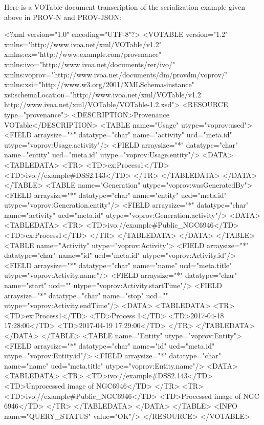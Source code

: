 Here is a VOTable document transcription of the serialization example given above in PROV-N and PROV-JSON:

\begin{verbnobox}[\scriptsize]
<?xml version="1.0" encoding="UTF-8"?>
<VOTABLE version="1.2" xmlns="http://www.ivoa.net/xml/VOTable/v1.2" xmlns:ex="http://www.example.com/provenance" xmlns:ivo="http://www.ivoa.net/documents/rer/ivo/" xmlns:voprov="http://www.ivoa.net/documents/dm/provdm/voprov/" xmlns:xsi="http://www.w3.org/2001/XMLSchema-instance" xsi:schemaLocation="http://www.ivoa.net/xml/VOTable/v1.2 http://www.ivoa.net/xml/VOTable/VOTable-1.2.xsd">
  <RESOURCE type="provenance">
    <DESCRIPTION>Provenance VOTable</DESCRIPTION>
    <TABLE name="Usage" utype="voprov:used">
      <FIELD arraysize="*" datatype="char" name="activity" ucd="meta.id" utype="voprov:Usage.activity"/>
      <FIELD arraysize="*" datatype="char" name="entity" ucd="meta.id" utype="voprov:Usage.entity"/>
      <DATA>
        <TABLEDATA>
          <TR>
            <TD>ex:Process1</TD>
            <TD>ivo://example#DSS2.143</TD>
          </TR>
        </TABLEDATA>
      </DATA>
    </TABLE>
    <TABLE name="Generation" utype="voprov:wasGeneratedBy">
      <FIELD arraysize="*" datatype="char" name="entity" ucd="meta.id" utype="voprov:Generation.entity"/>
      <FIELD arraysize="*" datatype="char" name="activity" ucd="meta.id" utype="voprov:Generation.activity"/>
      <DATA>
        <TABLEDATA>
          <TR>
            <TD>ivo://example#Public_NGC6946</TD>
            <TD>ex:Process1</TD>
          </TR>
        </TABLEDATA>
      </DATA>
    </TABLE>
    <TABLE name="Activity" utype="voprov:Activity">
      <FIELD arraysize="*" datatype="char" name="id" ucd="meta.id" utype="voprov:Activity.id"/>
      <FIELD arraysize="*" datatype="char" name="name" ucd="meta.title" utype="voprov:Activity.name"/>
      <FIELD arraysize="*" datatype="char" name="start" ucd="" utype="voprov:Activity.startTime"/>
      <FIELD arraysize="*" datatype="char" name="stop" ucd="" utype="voprov:Activity.endTime"/>
      <DATA>
        <TABLEDATA>
          <TR>
            <TD>ex:Process1</TD>
            <TD>Process 1</TD>
            <TD>2017-04-18 17:28:00</TD>
            <TD>2017-04-19 17:29:00</TD>
          </TR>
        </TABLEDATA>
      </DATA>
    </TABLE>
    <TABLE name="Entity" utype="voprov:Entity">
      <FIELD arraysize="*" datatype="char" name="id" ucd="meta.id" utype="voprov:Entity.id"/>
      <FIELD arraysize="*" datatype="char" name="name" ucd="meta.title" utype="voprov:Entity.name"/>
      <DATA>
        <TABLEDATA>
          <TR>
            <TD>ivo://example#DSS2.143</TD>
            <TD>Unprocessed image of NGC6946</TD>
          </TR>
          <TR>
            <TD>ivo://example#Public_NGC6946</TD>
            <TD>Processed image of NGC 6946</TD>
          </TR>
        </TABLEDATA>
      </DATA>
    </TABLE>
    <INFO name="QUERY_STATUS" value="OK"/>
  </RESOURCE>
</VOTABLE>

\end{verbnobox}

